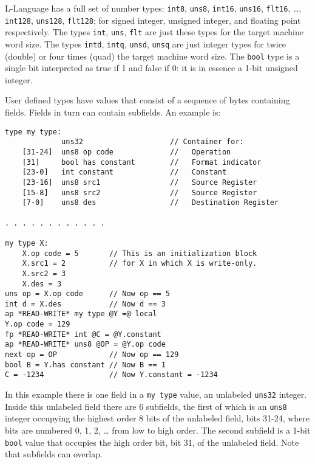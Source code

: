 \documentclass[12pt]{article}
\newenvironment{indpar}[1][0.3in]%
	{\begin{list}{}%
		     {\setlength{\itemsep}{0in}%
		      \setlength{\topsep}{0in}%
		      \setlength{\parsep}{1ex}%
		      \setlength{\labelwidth}{#1}%
		      \setlength{\leftmargin}{#1}%
		      \addtolength{\leftmargin}{\labelsep}}%
	 \item}%
	{\end{list}}
\begin{document}
L-Language has a full set of number types:
{\tt int8}, {\tt uns8},
{\tt int16}, {\tt uns16}, {\tt flt16}, \ldots,
{\tt int128}, {\tt uns128}, {\tt flt128}; for signed integer,
unsigned integer, and floating point respectively.
The types {\tt int}, {\tt uns}, {\tt flt} are just these
types for the target machine word size.
The types {\tt intd}, {\tt intq}, {\tt unsd}, {\tt unsq} are just integer
types for twice (double) or four times (quad) the target machine word size.
The {\tt bool} type is a single bit interpreted as true if
1 and false if 0: it is in essence a 1-bit unsigned integer.

User defined types have values that
consist of a sequence of bytes containing fields.
Fields in turn can contain subfields.
An example is:

\begin{indpar}\begin{verbatim}
type my type:
             uns32                    // Container for:
    [31-24]  uns8 op code             //   Operation
    [31]     bool has constant        //   Format indicator
    [23-0]   int constant             //   Constant
    [23-16]  uns8 src1                //   Source Register
    [15-8]   uns8 src2                //   Source Register
    [7-0]    uns8 des                 //   Destination Register

. . . . . . . . . . . .

my type X:
    X.op code = 5       // This is an initialization block
    X.src1 = 2          // for X in which X is write-only.
    X.src2 = 3
    X.des = 3
uns op = X.op code      // Now op == 5
int d = X.des           // Now d == 3
ap *READ-WRITE* my type @Y =@ local
Y.op code = 129
fp *READ-WRITE* int @C = @Y.constant
ap *READ-WRITE* uns8 @OP = @Y.op code
next op = OP            // Now op == 129
bool B = Y.has constant // Now B == 1
C = -1234               // Now Y.constant = -1234
\end{verbatim}\end{indpar}

In this example there is one field in a {\tt my type} value,
an unlabeled {\tt uns32} integer.
Inside this unlabeled field there are 6 subfields, the first of which is
an {\tt uns8} integer occupying the highest order 8
bits of the unlabeled field, bits 31-24,
where bits are numbered 0, 1, 2, \ldots{} from
low to high order.  The second subfield is a 1-bit {\tt bool}
value that occupies the high order bit, bit 31, of the unlabeled field.
Note that subfields can overlap.
\end{document}
